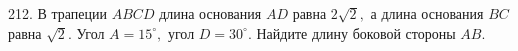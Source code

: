 212. В трапеции  $ABCD$ длина основания  $AD$ равна  $2\sqrt{2},$ а длина основания  $BC$ равна  $\sqrt{2}.$ Угол $A=15^\circ,$
угол $D=30^\circ.$ Найдите длину боковой стороны  $AB.$\\
